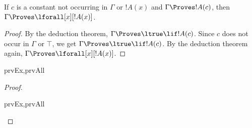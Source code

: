 \documentclass[../../../include/open-logic-section]{subfiles}
\begin{document}


\begin{thm}
 If $c$ is a constant not occurring
in $\Gamma$ or $!A(x)$ and $\Gamma \Proves !A(c)$, then $\Gamma
\Proves \lforall[x][!A(x)]$.
\end{thm}

\begin{proof}
By the deduction theorem, $\Gamma \Proves \ltrue \lif !A(c)$. Since
$c$ does not occur in $\Gamma$ or $\top$, we get $\Gamma \Proves
\ltrue \lif !A(c)$. By the deduction theorem again, $\Gamma \Proves
\lforall[x][!A(x)]$.
\end{proof}

\begin{prop}
\begin{tagenumerate}{prvEx,prvAll}

\end{tagenumerate}
\end{prop}

\begin{proof}
\begin{tagenumerate}{prvEx,prvAll}
\end{tagenumerate}
\end{proof}
\end{document}
